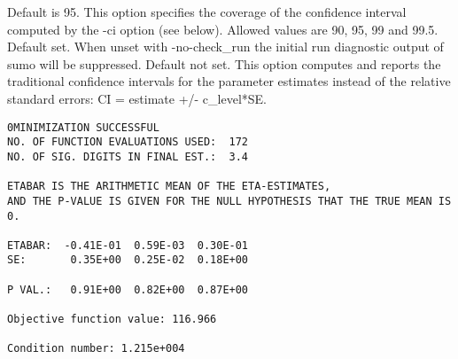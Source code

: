 \begin{optionlist}
Default is 95. This option specifies the coverage of the confidence interval computed by the -ci option (see below). Allowed values are 90, 95, 99 and 99.5. 
\nextopt
{}
Default set. When unset with -no-check\_run the initial run diagnostic output of sumo will be suppressed. 
\nextopt
{}
Default not set. This option computes and reports the traditional confidence intervals for the parameter estimates instead of the relative standard errors: CI = estimate +/- c\_level*SE. 
\begin{verbatim}
0MINIMIZATION SUCCESSFUL
NO. OF FUNCTION EVALUATIONS USED:  172
NO. OF SIG. DIGITS IN FINAL EST.:  3.4

ETABAR IS THE ARITHMETIC MEAN OF THE ETA-ESTIMATES,
AND THE P-VALUE IS GIVEN FOR THE NULL HYPOTHESIS THAT THE TRUE MEAN IS 0.

ETABAR:  -0.41E-01  0.59E-03  0.30E-01
SE:       0.35E+00  0.25E-02  0.18E+00

P VAL.:   0.91E+00  0.82E+00  0.87E+00

Objective function value: 116.966

Condition number: 1.215e+004


\end{verbatim}
\end{optionlist}
